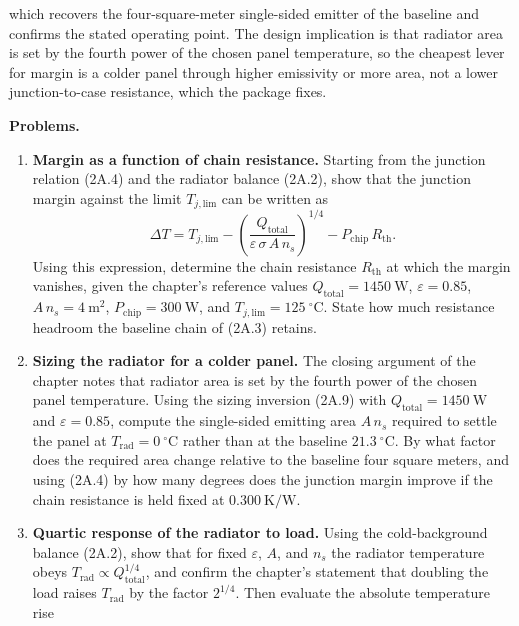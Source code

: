 \documentclass[
  11pt,
  openany,
  oneside]{book}
\begin{document}
which recovers the four-square-meter single-sided emitter of the
baseline and confirms the stated operating point. The design implication
is that radiator area is set by the fourth power of the chosen panel
temperature, so the cheapest lever for margin is a colder panel through
higher emissivity or more area, not a lower junction-to-case resistance,
which the package fixes.

\textbf{Problems.}

\begin{enumerate}
\def\labelenumi{\arabic{enumi}.}
\item
  \textbf{Margin as a function of chain resistance.} Starting from the
  junction relation (2A.4) and the radiator balance (2A.2), show that
  the junction margin against the limit \(T_{j,\mathrm{lim}}\) can be
  written as
  \[\Delta T = T_{j,\mathrm{lim}} - \left(\frac{Q_{\mathrm{total}}}{\varepsilon\,\sigma\,A\,n_s}\right)^{1/4} - P_{\mathrm{chip}}\,R_{\mathrm{th}}.\]
  Using this expression, determine the chain resistance
  \(R_{\mathrm{th}}\) at which the margin vanishes, given the chapter's
  reference values \(Q_{\mathrm{total}} = 1450\ \mathrm{W}\),
  \(\varepsilon = 0.85\), \(A\,n_s = 4\ \mathrm{m^2}\),
  \(P_{\mathrm{chip}} = 300\ \mathrm{W}\), and
  \(T_{j,\mathrm{lim}} = 125\ ^\circ\mathrm{C}\). State how much
  resistance headroom the baseline chain of (2A.3) retains.
\item
  \textbf{Sizing the radiator for a colder panel.} The closing argument
  of the chapter notes that radiator area is set by the fourth power of
  the chosen panel temperature. Using the sizing inversion (2A.9) with
  \(Q_{\mathrm{total}} = 1450\ \mathrm{W}\) and \(\varepsilon = 0.85\),
  compute the single-sided emitting area \(A\,n_s\) required to settle
  the panel at \(T_{\mathrm{rad}} = 0\ ^\circ\mathrm{C}\) rather than at
  the baseline \(21.3\ ^\circ\mathrm{C}\). By what factor does the
  required area change relative to the baseline four square meters, and
  using (2A.4) by how many degrees does the junction margin improve if
  the chain resistance is held fixed at \(0.300\ \mathrm{K/W}\).
\item
  \textbf{Quartic response of the radiator to load.} Using the
  cold-background balance (2A.2), show that for fixed \(\varepsilon\),
  \(A\), and \(n_s\) the radiator temperature obeys
  \(T_{\mathrm{rad}} \propto Q_{\mathrm{total}}^{1/4}\), and confirm the
  chapter's statement that doubling the load raises \(T_{\mathrm{rad}}\)
  by the factor \(2^{1/4}\). Then evaluate the absolute temperature rise

\end{enumerate}
\end{document}
